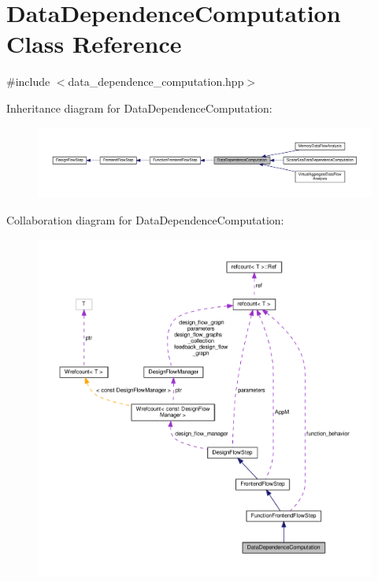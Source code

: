 \hypertarget{classDataDependenceComputation}{}\section{Data\+Dependence\+Computation Class Reference}
\label{classDataDependenceComputation}


{\ttfamily \#include $<$data\+\_\+dependence\+\_\+computation.\+hpp$>$}



Inheritance diagram for Data\+Dependence\+Computation\+:
\nopagebreak
\begin{figure}[H]
\begin{center}
\leavevmode
\includegraphics[width=350pt]{db/d9b/classDataDependenceComputation__inherit__graph}
\end{center}
\end{figure}


Collaboration diagram for Data\+Dependence\+Computation\+:
\nopagebreak
\begin{figure}[H]
\begin{center}
\leavevmode
\includegraphics[width=350pt]{df/d66/classDataDependenceComputation__coll__graph}
\end{center}
\end{figure}

